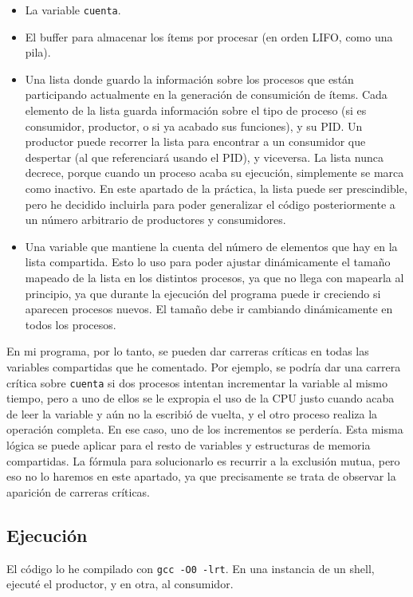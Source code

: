 \documentclass[a4paper]{article}
\begin{document}
\begin{itemize}
    \item La variable \texttt{cuenta}.
    \item El buffer para almacenar los ítems por procesar (en orden LIFO, como una pila).
    \item Una lista donde guardo la información sobre los procesos que están participando actualmente en la generación de consumición de ítems. Cada elemento de la lista guarda información sobre el tipo de proceso (si es consumidor, productor, o si ya acabado sus funciones), y su PID. Un productor puede recorrer la lista para encontrar a un consumidor que despertar (al que referenciará usando el PID), y viceversa. La lista nunca decrece, porque cuando un proceso acaba su ejecución, simplemente se marca como inactivo. En este apartado de la práctica, la lista puede ser prescindible, pero he decidido incluirla para poder generalizar el código posteriormente a un número arbitrario de productores y consumidores.
    \item Una variable que mantiene la cuenta del número de elementos que hay en la lista compartida. Esto lo uso para poder ajustar dinámicamente el tamaño mapeado de la lista en los distintos procesos, ya que no llega con mapearla al principio, ya que durante la ejecución del programa puede ir creciendo si aparecen procesos nuevos. El tamaño debe ir cambiando dinámicamente en todos los procesos.
\end{itemize}

En mi programa, por lo tanto, se pueden dar carreras críticas en todas las variables compartidas que he comentado. Por ejemplo, se podría dar una carrera crítica sobre \texttt{cuenta} si dos procesos intentan incrementar la variable al mismo tiempo, pero a uno de ellos se le expropia el uso de la CPU justo cuando acaba de leer la variable y aún no la escribió de vuelta, y el otro proceso realiza la operación completa. En ese caso, uno de los incrementos se perdería. Esta misma lógica se puede aplicar para el resto de variables y estructuras de memoria compartidas. La fórmula para solucionarlo es recurrir a la exclusión mutua, pero eso no lo haremos en este apartado, ya que precisamente se trata de observar la aparición de carreras críticas.

\subsection{Ejecución}

El código lo he compilado con \texttt{gcc -O0 -lrt}. En una instancia de un shell, ejecuté el productor, y en otra, al consumidor.
\end{document}

